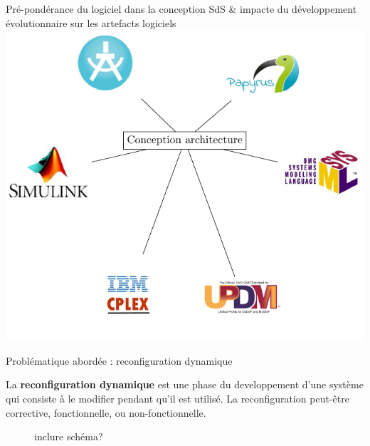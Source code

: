 \begin{frame}{Pré-pondérance du logiciel dans la conception SdS \& impacte du développement évolutionnaire sur les artefacts logiciels}
\centering
\includegraphics[scale=0.7]{imgs/logiciel.pdf}
\end{frame}


\begin{frame}{Problématique abordée : reconfiguration dynamique}
\begin{definition}
La \textbf{reconfiguration dynamique} est une phase du
developpement d'une système qui consiste à le modifier pendant qu’il est
utilisé. La reconfiguration peut-être corrective, fonctionnelle,  ou
non-fonctionnelle.
\end{definition}
\begin{figure}
inclure schéma? 
\end{figure}
\end{frame}

